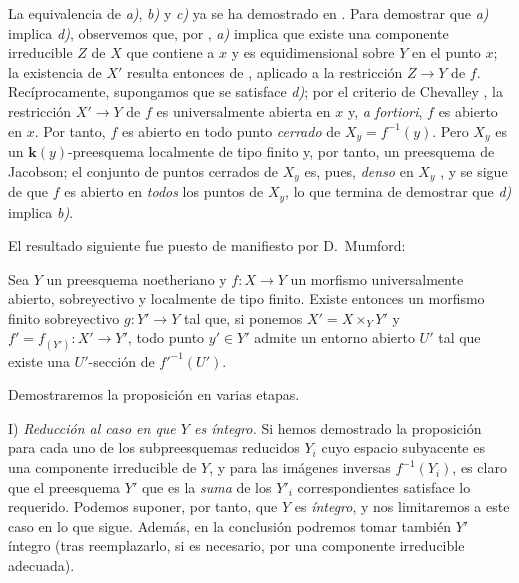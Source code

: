 La equivalencia de \emph{a)}, \emph{b)} y \emph{c)} ya se ha demostrado en .
Para demostrar que \emph{a)} implica \emph{d)}, observemos que, por , \emph{a)} implica que existe una componente irreducible $Z$ de $X$ que contiene a $x$ y es equidimensional sobre $Y$ en el punto $x$; la existencia de $X'$ resulta entonces de , aplicado a la restricción $Z\to Y$ de $f$.
Recíprocamente, supongamos que se satisface \emph{d)}; por el criterio de Chevalley , la restricción $X'\to Y$ de $f$ es universalmente abierta en $x$ y, \emph{a fortiori}, $f$ es abierto en $x$. Por tanto, $f$ es abierto en todo punto \emph{cerrado} de $X_y=f^{-1}(y)$.
Pero $X_y$ es un $\boldsymbol{k}(y)$-preesquema localmente de tipo finito y, por tanto, un preesquema de Jacobson; el conjunto de puntos cerrados de $X_y$ es, pues, \emph{denso} en $X_y$ , y se sigue de  que $f$ es abierto en \emph{todos} los puntos de $X_y$, lo que termina de demostrar que \emph{d)} implica \emph{b)}.

El resultado siguiente fue puesto de manifiesto por D.\ Mumford:

\begin{proposition}[14.5.10]
\label{IV.14.5.10}
Sea $Y$ un preesquema noetheriano y $f:X\to Y$ un morfismo universalmente abierto, sobreyectivo y localmente de tipo finito.
Existe entonces un morfismo finito sobreyectivo $g:Y'\to Y$ tal que, si ponemos $X'=X\times_Y Y'$ y $f'=f_{(Y')}:X'\to Y'$, todo punto $y'\in Y'$ admite un entorno abierto $U'$ tal que existe una $U'$-sección de $f'^{-1}(U')$.
\end{proposition}

Demostraremos la proposición en varias etapas.

I) \emph{Reducción al caso en que $Y$ es íntegro.}
Si hemos demostrado la proposición para cada uno de los subpreesquemas reducidos $Y_i$ cuyo espacio subyacente es una componente irreducible de $Y$, y para las imágenes inversas $f^{-1}(Y_i)$, es claro que el preesquema $Y'$ que es la \emph{suma} de los $Y'_i$ correspondientes satisface lo requerido.
Podemos suponer, por tanto, que $Y$ es \emph{íntegro}, y nos limitaremos a este caso en lo que sigue.
Además, en la conclusión podremos tomar también $Y'$ íntegro (tras reemplazarlo, si es necesario, por una componente irreducible adecuada).

